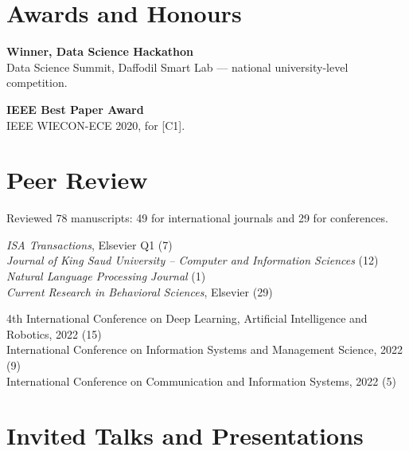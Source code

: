 \documentclass[a4paper,11pt]{article}
\let\origsection\section
\renewcommand{\section}[1]{\needspace{7\baselineskip}\origsection{#1}}
\newenvironment{datedlist}
  {\begin{list}{}{%
     \setlength{\leftmargin}{3.3cm}\setlength{\labelwidth}{2.9cm}
     \setlength{\labelsep}{0.4cm}\setlength{\itemsep}{5pt}
     \setlength{\parsep}{0pt}\setlength{\topsep}{4pt}
     \renewcommand{\makelabel}[1]{##1\hfill}}%
   \interlinepenalty=10000 }
  {\end{list}}
\begin{document}
\section{Awards and Honours}

\begin{datedlist}
\item[2021] \textbf{Winner, Data Science Hackathon}\\
  Data Science Summit, Daffodil Smart Lab --- national university-level competition.

\item[2020] \textbf{IEEE Best Paper Award}\\
  IEEE WIECON-ECE 2020, for [C1].
\end{datedlist}

\section{Peer Review}

Reviewed 78 manuscripts: 49 for international journals and 29 for conferences.

\vspace{4pt}

\begin{datedlist}
\item[Journals]
  \textit{ISA Transactions}, Elsevier Q1 (7)\\
  \textit{Journal of King Saud University -- Computer and Information Sciences} (12)\\
  \textit{Natural Language Processing Journal} (1)\\
  \textit{Current Research in Behavioral Sciences}, Elsevier (29)

\item[Conferences]
  4th International Conference on Deep Learning, Artificial Intelligence and Robotics,
  2022 (15)\\
  International Conference on Information Systems and Management Science, 2022 (9)\\
  International Conference on Communication and Information Systems, 2022 (5)
\end{datedlist}

\section{Invited Talks and Presentations}
\end{document}
